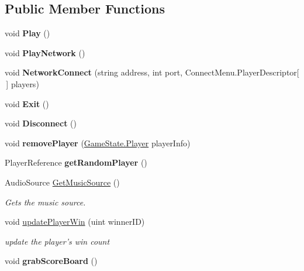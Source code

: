 \subsection*{Public Member Functions}
\begin{DoxyCompactItemize}
\item 
\hypertarget{class_game_manager_a3403831c40f16191e3997be60d95380b}{void {\bfseries Play} ()}\label{class_game_manager_a3403831c40f16191e3997be60d95380b}

\item 
\hypertarget{class_game_manager_a1138f86278583414cba9456d02d0fa1c}{void {\bfseries Play\-Network} ()}\label{class_game_manager_a1138f86278583414cba9456d02d0fa1c}

\item 
\hypertarget{class_game_manager_a3c3a8e05664851d7642c13989af691cf}{void {\bfseries Network\-Connect} (string address, int port, Connect\-Menu.\-Player\-Descriptor\mbox{[}$\,$\mbox{]} players)}\label{class_game_manager_a3c3a8e05664851d7642c13989af691cf}

\item 
\hypertarget{class_game_manager_a5d9cafdd495a4ed2760de13b7b9c80b6}{void {\bfseries Exit} ()}\label{class_game_manager_a5d9cafdd495a4ed2760de13b7b9c80b6}

\item 
\hypertarget{class_game_manager_adb53a672ec492ed3a0cb89ca00808bd4}{void {\bfseries Disconnect} ()}\label{class_game_manager_adb53a672ec492ed3a0cb89ca00808bd4}

\item 
\hypertarget{class_game_manager_aebdaf24911f168c490194f548297f8d1}{void {\bfseries remove\-Player} (\hyperlink{struct_game_state_1_1_player}{Game\-State.\-Player} player\-Info)}\label{class_game_manager_aebdaf24911f168c490194f548297f8d1}

\item 
\hypertarget{class_game_manager_a5682ae7c68535cd62fa0791e3c859811}{Player\-Reference {\bfseries get\-Random\-Player} ()}\label{class_game_manager_a5682ae7c68535cd62fa0791e3c859811}

\item 
Audio\-Source \hyperlink{class_game_manager_abf59d5ce551af5e35529f71a99d89d76}{Get\-Music\-Source} ()
\begin{DoxyCompactList}\small\item\em Gets the music source. \end{DoxyCompactList}\item 
void \hyperlink{class_game_manager_a6a788456fbde7a3587013f1707586f73}{update\-Player\-Win} (uint winner\-I\-D)
\begin{DoxyCompactList}\small\item\em update the player's win count \end{DoxyCompactList}\item 
\hypertarget{class_game_manager_a414dcfd0d1f5a5904d2440165e42923d}{void {\bfseries grab\-Score\-Board} ()}\label{class_game_manager_a414dcfd0d1f5a5904d2440165e42923d}

\end{DoxyCompactItemize}
